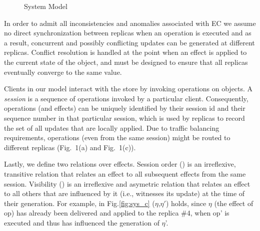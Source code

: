 \documentclass[authorversion]{sig-alternate-05-2015}
\begin{document}
\begin{figure}[h]
\label{fig:sys}
\caption{System Model}
\end{figure}
%
In order to admit all inconsistencies and anomalies associated with EC we assume no direct synchronization between replicas when an operation is 
executed and as a result, concurrent and possibly conflicting updates can be generated
at different replicas.
Conflict resolution is handled at the point when an effect is applied to the 
current state of the object, and must be designed to ensure that all replicas 
eventually converge to the same value. 

Clients in our model interact with the store by invoking operations on objects. 
A \emph{session} is a sequence of operations invoked by a particular client. 
Consequently, operations (and effects) can be uniquely identified by their session id and 
their sequence number in that particular session, which is used by
replicas to record the set of all updates that are locally applied. 
Due to traffic balancing requirements, 
operations (even from the same session) might be routed to different replicas (Fig.~1(a) and Fig.~1(c)).

Lastly, we define two relations over effects. 
Session order (\sor) is an irreflexive, transitive relation that relates an effect
 to all subsequent effects from the same session. Visibility (\visib) is an 
irreflexive and asymetric relation that relates an effect to all others that are influenced 
by it (i.e., witnesses its update) at the time of their generation. 
For example, in Fig.\ref{fig:sys_c} \visib($\eta$,$\eta'$) holds, since $\eta$ (the effect of op) 
has already been delivered and applied to the replica \#4, when op' is 
executed and thus has influenced the generation of $\eta$'.


















\end{document}
